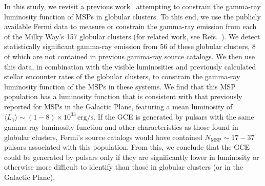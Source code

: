 In this study, we revisit a previous work~\cite{Hooper:2016rap} attempting to constrain the gamma-ray luminosity function of MSPs in globular clusters. To this end, we use the publicly available Fermi data to measure or constrain the gamma-ray emission from each of the Milky Way's 157 globular clusters (for related work, see Refs.~\cite{Hou:2024wpr,Ballet:2023qzs,Zhang:2023gwr,Evans:2022zno,Zhang:2022jlx,Yuan:2022egs,deMenezes:2018ilq,Cholis:2014noa,Fermi-LAT:2010gpc}). We detect statistically significant gamma-ray emission from 56 of these globular clusters, 8 of which are not contained in previous
gamma-ray source catalogs. We then use this data, in combination with the visible luminosities and previously calculated stellar encounter rates of the globular clusters, to constrain the gamma-ray luminosity function of the MSPs in these systems. We find that this MSP population has a luminosity function that is consistent with that previously reported for MSPs in the Galactic Plane, featuring a mean luminosity of $\langle L_{\gamma}\rangle \sim (1-8) \times 10^{33} \, \textrm{erg/s}$. If the GCE is generated by pulsars with the same gamma-ray luminosity function and other characteristics as those found in globular clusters, Fermi's source catalogs would have contained $N_\textrm{MSP} \sim 17-37$ pulsars associated with this population. From this, we conclude that the GCE could be generated by pulsars only if they are significantly lower in luminosity or otherwise more difficult to identify than those in globular clusters (or in the Galactic Plane). 

